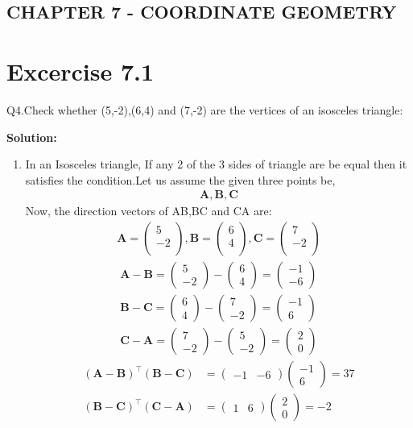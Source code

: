 \documentclass[12pt]{article}
\newcommand{\solution}{\noindent \textbf{Solution: }}
\newcommand{\myvec}[1]{\ensuremath{\begin{pmatrix}#1\end{pmatrix}}}
\let\vec\mathbf
\begin{document}
\begin{center}
\section*{CHAPTER 7 - COORDINATE GEOMETRY}

\end{center}
\section*{Excercise 7.1}

Q4.Check whether (5,-2),(6,4) and (7,-2) are the vertices of an isosceles triangle:

\solution
\begin{enumerate}
\item In an Isosceles triangle, If any 2 of the 3 sides of  triangle are be equal then it satisfies the condition.Let us assume the given three points be,
	\begin{align}
\vec{A} , \vec{B} , \vec{C}
	\end{align}
Now, the direction vectors of AB,BC and CA are:
	\begin{align}
	\vec{A} = \myvec{
	    5\\
	   -2\\
		},
	\vec{B} = \myvec{
	    6\\
		4\\
		},
	\vec{C} = \myvec{
		7\\
	   -2\\
	    }
	\end{align}  
	\begin{align}
		\vec{A} - \vec{B} = \myvec{5\\-2} - \myvec{6\\4} = \myvec{-1\\-6}\\
		\vec{B} - \vec{C} = \myvec{6\\4} - \myvec{7\\-2} = \myvec{-1\\6}\\
		\vec{C} - \vec{A} = \myvec{7\\-2} - \myvec{5\\-2} = \myvec{2\\0}		
	\end{align}
	\begin{align}
	(\vec{A}-\vec{B})^\top (\vec{B}-\vec{C}) &= \myvec{-1&-6} \myvec{-1\\6} = 37 \\
	(\vec{B}-\vec{C})^\top (\vec{C}-\vec{A}) &= \myvec{1&6} \myvec{2\\0}   = -2 \\

\end{align}
\end{enumerate}
\end{document}
